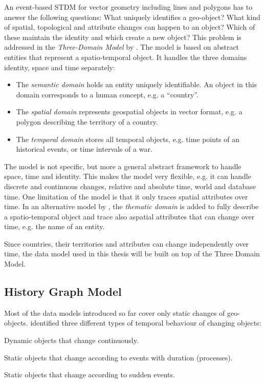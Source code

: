 An event-based STDM for vector geometry including lines and polygons has to answer the following questions: What uniquely identifies a geo-object? What kind of spatial, topological and attribute changes can happen to an object? Which of these maintain the identity and which create a new object? This problem is addressed in the \emph{Three-Domain Model} by \cite{yuan96threedomain, yuan96temporal}. The model is based on abstract entities that represent a spatio-temporal object. It handles the three domains identity, space and time separately:
\begin{itemize}
  \item The \emph{semantic domain} holds an entity uniquely identifiable. An object in this domain corresponds to a human concept, e.g. a ``country''.
  \item The \emph{spatial domain} represents geospatial objects in vector format, e.g. a polygon describing the territory of a country.
  \item The \emph{temporal domain} stores all temporal objects, e.g. time points of an historical events, or time intervals of a war.
\end{itemize}

The model is not specific, but more a general abstract framework to handle space, time and identity. This makes the model very flexible, e.g. it can handle discrete and continuous changes, relative and absolute time, world and database time. One limitation of the model is that it only traces spatial attributes over time. In an alternative model by \cite{claramunt95timeingis}, the \emph{thematic domain} is added to fully describe a spatio-temporal object and trace also aspatial attributes that can change over time, e.g. the name of an entity.



Since countries, their territories and attributes can change independently over time, the data model used in this thesis will be built on top of the Three Domain Model.


\subsection{History Graph Model} %
\label{sub:history_graph_model}

Most of the data models introduced so far cover only static changes of geo-objects. \cite{renolen96} identified three different types of temporal behaviour of changing objects:
\begin{compactitem}
  \item Dynamic objects that change continuously.
  \item Static objects that change according to events with duration (processes).
  \item Static objects that change according to sudden events.
\end{compactitem}

